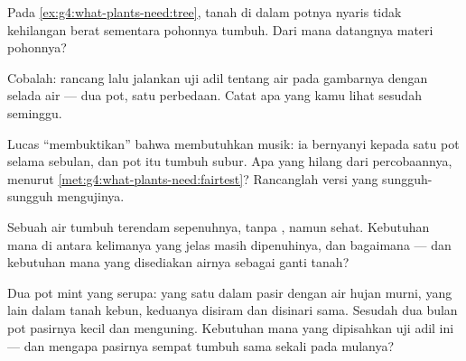 \begin{exercise}[$\star$]\label{exo:g4:what-plants-need:7}
Pada \cref{ex:g4:what-plants-need:tree}, tanah di dalam potnya nyaris
tidak kehilangan berat sementara pohonnya tumbuh. Dari mana datangnya
materi pohonnya?
\end{exercise}

\begin{exercise}[$\star$]\label{exo:g4:what-plants-need:8}
Cobalah: rancang lalu jalankan uji adil tentang air pada gambarnya
dengan selada air --- dua pot, satu perbedaan. Catat apa yang kamu
lihat sesudah seminggu.
\end{exercise}

\begin{exercise}[$\star\star$]\label{exo:g4:what-plants-need:9}
Lucas ``membuktikan'' bahwa  membutuhkan musik: ia bernyanyi
kepada satu pot selama sebulan, dan pot itu tumbuh subur. Apa yang
hilang dari percobaannya, menurut
\cref{met:g4:what-plants-need:fairtest}? Rancanglah versi yang
sungguh-sungguh mengujinya.
\end{exercise}

\begin{exercise}[$\star\star$]\label{exo:g4:what-plants-need:10}
Sebuah  air tumbuh terendam sepenuhnya, tanpa , namun
sehat. Kebutuhan mana di antara kelimanya yang jelas masih
dipenuhinya, dan bagaimana --- dan kebutuhan mana yang disediakan
airnya sebagai ganti tanah?
\end{exercise}

\begin{exercise}[$\star\star\star$]\label{exo:g4:what-plants-need:11}
Dua pot  mint yang serupa: yang satu dalam pasir dengan air hujan
murni, yang lain dalam tanah kebun, keduanya disiram dan disinari
sama. Sesudah dua bulan pot pasirnya kecil dan menguning. Kebutuhan
mana yang dipisahkan uji adil ini --- dan mengapa  pasirnya
sempat tumbuh sama sekali pada mulanya?
\end{exercise}
